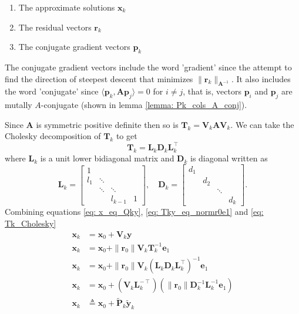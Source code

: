 \begin{enumerate}
    \item The approximate solutions $\bm{x}_{k}$
    \item The residual vectors $\bm{r}_{k}$
    \item The conjugate gradient vectors $\bm{p}_k$
\end{enumerate}
The conjugate gradient vectors include the word 'gradient' since the attempt to find the direction of steepest descent that minimizes $\| \bm{r}_{k} \|_{\bm{A}^{-1}}$. It also includes the word 'conjugate' since $\langle \bm{p}_k, \bm{A} \bm{p}_j \rangle = 0$ for $i \neq j$, that is, vectors $\bm{p}_i$ and $\bm{p}_j$ are mutally $A$-conjugate (shown in lemma \ref{lemma: Pk_cols_A_conj}).

Since $\bm{A}$ is symmetric positive definite then so is $\bm{T}_k  = \bm{V}_{k} \bm{A} \bm{V}_{k}$. We can take the Cholesky decomposition of $\bm{T}_k$ to get
\begin{equation} \label{eq: Tk_Cholesky}
    \bm{T}_k = \bm{L}_k \bm{D}_k \bm{L}_k^{\intercal}
\end{equation}
where $\bm{L}_k$ is a unit lower bidiagonal matrix and $\bm{D}_k$ is diagonal written as
\[
    \bm{L}_k =
    \begin{bmatrix}
        1   &        &         &   \\
        l_1 & \ddots &         &   \\
            & \ddots & \ddots  &   \\
            &        & l_{k-1} & 1
    \end{bmatrix}, \quad
    \bm{D}_k =
    \begin{bmatrix}
        d_1 &     &        &     \\
            & d_2 &        &     \\
            &     & \ddots &     \\
            &     &        & d_k
    \end{bmatrix}.
\]
Combining equations \ref{eq: x_eq_Qky}, \ref{eq: Tky_eq_normr0e1} and \ref{eq: Tk_Cholesky}
\begin{align*}
    \bm{x}_k & = \bm{x}_0 + \bm{V}_{k} \bm{y}                                                                                                  \\
    \bm{x}_k & = \bm{x}_0 + \| \bm{r}_0 \| \bm{V}_{k} \bm{T}_k^{-1} \bm{e}_1                                                                   \\
    \bm{x}_k & = \bm{x}_0 + \| \bm{r}_0 \| \bm{V}_{k} \left( \bm{L}_k \bm{D}_k \bm{L}_k^{\intercal} \right)^{-1} \bm{e}_1                      \\
    \bm{x}_k & = \bm{x}_0 + \left( \bm{V}_{k} \bm{L}_k^{-\intercal} \right) \left( \| \bm{r}_0 \| \bm{D}_k^{-1} \bm{L}_k^{-1} \bm{e}_1 \right) \\
    \bm{x}_k & \triangleq \bm{x}_0 + \tilde{\bm{P}}_k \tilde{\bm{y}}_k
\end{align*}
